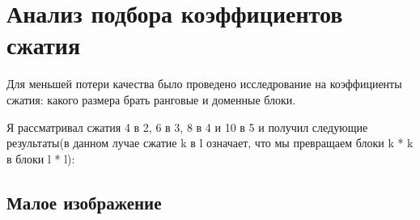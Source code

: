 \documentclass{article}
\begin{document}
\section{Анализ подбора коэффициентов сжатия}

Для меньшей потери качества было проведено исследрование на коэффициенты сжатия: какого размера брать ранговые и доменные блоки.

Я рассматривал сжатия 4 в 2, 6 в 3, 8 в 4 и 10 в 5 и получил следующие результаты(в данном лучае сжатие k в l означает, что мы превращаем блоки k * k в блоки l * l):

\begin{figure}[h]
	\hfill
\end{figure}

\subsection{Малое изображение}
\end{document}
